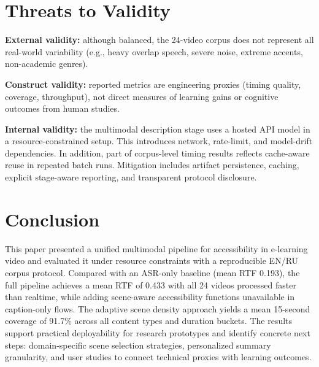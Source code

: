 \documentclass[conference]{IEEEtran}
\begin{document}
\section{Threats to Validity}
\textbf{External validity:} although balanced, the 24-video corpus does not represent all real-world variability (e.g., heavy overlap speech, severe noise, extreme accents, non-academic genres).

\textbf{Construct validity:} reported metrics are engineering proxies (timing quality, coverage, throughput), not direct measures of learning gains or cognitive outcomes from human studies.

\textbf{Internal validity:} the multimodal description stage uses a hosted API model in a resource-constrained setup. This introduces network, rate-limit, and model-drift dependencies. In addition, part of corpus-level timing results reflects cache-aware reuse in repeated batch runs. Mitigation includes artifact persistence, caching, explicit stage-aware reporting, and transparent protocol disclosure.

\section{Conclusion}
This paper presented a unified multimodal pipeline for accessibility in e-learning video and evaluated it under resource constraints with a reproducible EN/RU corpus protocol. Compared with an ASR-only baseline (mean RTF 0.193), the full pipeline achieves a mean RTF of 0.433 with all 24 videos processed faster than realtime, while adding scene-aware accessibility functions unavailable in caption-only flows. The adaptive scene density approach yields a mean 15-second coverage of 91.7\% across all content types and duration buckets. The results support practical deployability for research prototypes and identify concrete next steps: domain-specific scene selection strategies, personalized summary granularity, and user studies to connect technical proxies with learning outcomes.



\end{document}
